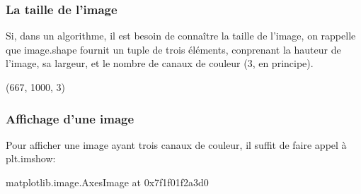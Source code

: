 \documentclass[letterpaper,10pt,english]{jupyterBook}
\begin{document}
\subsubsection{La taille de l’image}
\label{\detokenize{notebooks/images/TRAITEMENT-DES-IMAGES:la-taille-de-l-image}}
\sphinxAtStartPar
Si, dans un algorithme, il est besoin de connaître la taille de l’image, on rappelle que image.shape fournit un tuple de trois éléments, conprenant la hauteur de l’image, sa largeur, et le nombre de canaux de couleur (3, en principe).
\begin{sphinxVerbatimInput}

\begin{sphinxVerbatim}[commandchars=\\\{\}]
\end{sphinxVerbatim}
\end{sphinxVerbatimInput}
\begin{sphinxVerbatimOutput}

\begin{sphinxVerbatim}[commandchars=\\\{\}]
(667, 1000, 3)
\end{sphinxVerbatim}
\end{sphinxVerbatimOutput}


\subsubsection{Affichage d’une image}
\label{\detokenize{notebooks/images/TRAITEMENT-DES-IMAGES:affichage-dune-image}}
\sphinxAtStartPar
Pour afficher une image ayant trois canaux de couleur, il suffit de faire appel à plt.imshow:
\begin{sphinxVerbatimInput}

\begin{sphinxVerbatim}[commandchars=\\\{\}]
\end{sphinxVerbatim}
\end{sphinxVerbatimInput}
\begin{sphinxVerbatimOutput}

\begin{sphinxVerbatim}[commandchars=\\\{\}]
\PYGZlt{}matplotlib.image.AxesImage at 0x7f1f01f2a3d0\PYGZgt{}
\end{sphinxVerbatim}

\noindent{}
\end{sphinxVerbatimOutput}
\end{document}
